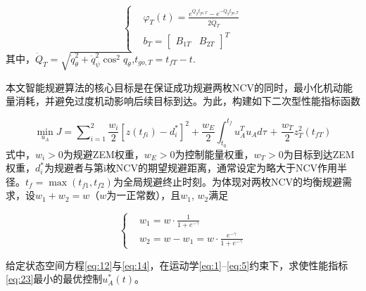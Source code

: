 \begin{equation}
\label{eq:22}
\left\{
\begin{aligned}
& {\varphi _T}(t) = \frac{{{e^{{{\dot Q}_T}{t_{go,T}}}} - {e^{ - {{\dot Q}_T}{t_{go,T}}}}}}{{2{{\dot Q}_T}}} \\
& {b_T} = {\left[ {\begin{array}{*{20}{c}}
  {{B_{1T}}}&{{B_{2T}}}
\end{array}} \right]^T}
\end{aligned}
\right.
\end{equation}
其中，${\dot Q_T} = \sqrt {\dot q_\theta ^2 + \dot q_\psi ^2{{\cos }^2}{q_\theta }} $,${t_{go,T}} = {t_{fT}} - t$.

本文智能规避算法的核心目标是在保证成功规避两枚NCV的同时，最小化机动能量消耗，并避免过度机动影响后续目标到达。为此，构建如下二次型性能指标函数

\begin{equation}
\label{eq:23}
\mathop {\min }\limits_{{u_A}} J = \sum\nolimits_{i = 1}^2 {\frac{{{w_i}}}{2}{{\left[ {z\left( {{t_{fi}}} \right) - d_i^*} \right]}^2}}  + \frac{{{w_E}}}{2}\int_{{t_0}}^{{t_f}} {u_A^T{u_A}d\tau {\text{ + }}\frac{{{w_T}}}{2}z_T^2\left( {{t_{fT}}} \right)}
\end{equation}
式中，${w_i} > 0$为规避ZEM权重，${w_E} > 0$为控制能量权重，${w_T} > 0$为目标到达ZEM权重，$d_i^*$为规避者与第i枚NCV的期望规避距离，通常设定为略大于NCV作用半径。${t_f} = \max ({t_{f1}},{t_{f2}})$为全局规避终止时刻。为体现对两枚NCV的均衡规避需求，设${w_1} + {w_2} = w$（$w$为一正常数），且${w_1}$, ${w_2}$满足

\begin{equation}
\label{eq:24}
\left\{
\begin{aligned}
& {w_1} = w \cdot \frac{1}{{1 + {e^{ - \gamma }}}} \\
& {w_2} = w - {w_1} = w \cdot \frac{{{e^{ - \gamma }}}}{{1 + {e^{ - \gamma }}}}
\end{aligned}
\right.
\end{equation}
\begin{problem}[一体化最优规避与制导]
给定状态空间方程\eqref{eq:12}与\eqref{eq:14}，在运动学\eqref{eq:1}–\eqref{eq:5}约束下，求使性能指标\eqref{eq:23}最小的最优控制$u_A^*(t)$。
\end{problem}
